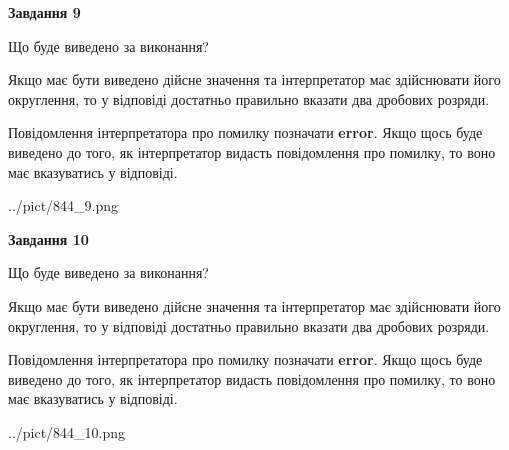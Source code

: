 \documentclass[12pt, ukrainian]{article}
\begin{document}
{\begin {Large}
{\begin {center}\textbf{Завдання 9}\end {center}}\par
Що буде виведено за виконання? \par

Якщо має бути виведено дійсне значення та інтерпретатор має здійснювати його округлення, 
то у відповіді достатньо правильно вказати два дробових розряди.

Повідомлення інтерпретатора про помилку позначати \textbf{error}.
Якщо щось буде виведено до того, як інтерпретатор видасть повідомлення про помилку, 
то воно має вказуватись у відповіді. \par

\begin{center}
	{../pict/844_9.png}
\end{center}
\newpage

{\begin {center}\textbf{Завдання 10}\end {center}}\par
Що буде виведено за виконання? \par

Якщо має бути виведено дійсне значення та інтерпретатор має здійснювати його округлення, 
то у відповіді достатньо правильно вказати два дробових розряди.

Повідомлення інтерпретатора про помилку позначати \textbf{error}.
Якщо щось буде виведено до того, як інтерпретатор видасть повідомлення про помилку, 
то воно має вказуватись у відповіді. \par

\begin{center}
	{../pict/844_10.png}
\end{center}
\newpage

\end {Large}}
\end{document}
